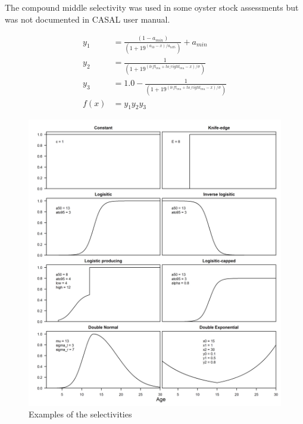 The compound middle selectivity was used in some oyster stock assessments but was not documented in CASAL user manual.

\begin{align*}
y_1 & = \frac{\left(1 - a_{min}\right)}{\left(1 + 19^{(a_{50} - x)/a_{to95}}\right)}  + a_{min}\\
y_2 & = \frac{1}{\left(1 + 19^{(left_{mu} + to\_right_{mu} - x)/\sigma}\right)}\\
y_3 & = 1.0 -  \frac{1}{\left(1 + 19^{(left_{mu} + to\_right_{mu} - x)/\sigma}\right)}\\
f(x)  &= 	y_1 y_2 y_3
\end{align*}

\begin{figure}[H]
	\centering
	\includegraphics[scale = 0.9]{Figures/Selectivities.jpg}
	\caption{Examples of the selectivities}
	\label{fig:select examples}
\end{figure}

\subsection{}\label{sec:TimeVarying} 

